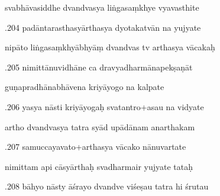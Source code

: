 \documentclass[article,12pt,a4paper]{memoir}%
\newcounter{parCount}
\begin{document}
	  
	  \pstart \leavevmode%
	svabhāvasiddhe dvandvasya liṅgasaṃkhye vyavasthite 
	{}
	\pend%
      

	  
	  \pstart {}.204 padāntarasthasyārthasya dyotakatvān na yujyate 
	{}
	\pend%
      

	  
	  \pstart \leavevmode%
	nipāto liṅgasaṃkhyābhyāṃ dvandvas tv arthasya vācakaḥ 
	{}
	\pend%
      

	  
	  \pstart {}.205 nimittānuvidhāne ca dravyadharmānapekṣaṇāt 
	{}
	\pend%
      

	  
	  \pstart \leavevmode%
	guṇapradhānabhāvena kriyāyogo na kalpate 
	{}
	\pend%
      

	  
	  \pstart {}.206 yasya nāsti kriyāyogaḥ svatantro+asau na vidyate 
	{}
	\pend%
      

	  
	  \pstart \leavevmode%
	artho dvandvasya tatra syād upādānam anarthakam 
	{}
	\pend%
      

	  
	  \pstart {}.207 samuccayavato+arthasya vācako nānuvartate 
	{}
	\pend%
      

	  
	  \pstart \leavevmode%
	nimittam api cāsyārthaḥ svadharmair yujyate tataḥ 
	{}
	\pend%
      

	  
	  \pstart {}.208 bāhyo nāsty āśrayo dvandve viśeṣau tatra hi śrutau 
	{}
	\pend%
      
\end{document}
